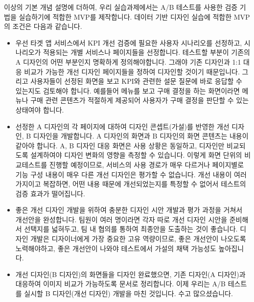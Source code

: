 \documentclass[
  letterpaper,
]{book}
\providecommand{\tightlist}{%
  \setlength{\itemsep}{0pt}\setlength{\parskip}{0pt}}\usepackage{longtable,booktabs,array}
\begin{document}
이상의 기본 개념 설명에 더하여, 우리 실습과제에서는 A/B 테스트를 사용한
검증 기법을 실습하기에 적합한 MVP를 제작합니다. 데이터 기반 디자인
실습에 적합한 MVP의 조건은 다음과 같습니다.

\begin{itemize}
\tightlist
\item
  우선 타겟 앱 서비스에서 KPI 개선 검증에 필요한 사용자 시나리오를
  선정하고, 시나리오가 적용되는 개별 서비스나 페이지들을 선정합니다.
  테스트할 부분이 기존의 A 디자인의 어떤 부분인지 명확하게
  정의해야합니다. 그래야 기존 디자인과 1:1 대응 비교가 가능한 개선
  디자인 페이지들을 정하여 디자인할 것이기 때문입니다. 그리고 사용자들이
  선정된 화면을 보고 KPI와 관련한 설문 질문에 바로 응답할 수 있는지도
  검토해야 합니다. 예를들어 메뉴를 보고 구매 결정을 하는 화면이라면
  메뉴나 구매 관련 콘텐츠가 적절하게 제공되어 사용자가 구매 결정을
  판단할 수 있는 상태여야 합니다.
\item
  선정한 A 디자인의 각 페이지에 대하여 디자인 콘셉트(가설)를 반영한 개선
  디자인, B 디자인을 개발합니다. A 디자인의 화면과 B 디자인의 화면
  콘텐츠는 내용이 같아야 합니다. A, B 디자인 대응 화면은 사용 상황은
  동일하고, 디자인만 비교되도록 설계하여야 디자인 변화의 영향을 측정할
  수 있습니다. 이렇게 화면 단위의 비교테스트를 진행할 예정이므로,
  서비스의 사용 경로가 매우 다르거나 페이지별로 기능 구성 내용이 매우
  다른 개선 디자인은 평가할 수 없습니다. 개선 내용이 여러가지이고
  복잡하면, 어떤 내용 때문에 개선되었는지를 특정할 수 없어서 테스트의
  검증 효과가 떨어집니다.
\item
  좋은 개선 디자인 개발을 위하여 충분한 디자인 시안 개발과 평가 과정을
  거쳐서 개선안을 완성합니다. 팀원이 여러 명이라면 각자 따로 개선 디자인
  시안을 준비해서 선택지를 넓혀두고, 팀 내 협의를 통하여 최종안을
  도출하는 것이 좋습니다. 디자인 개발은 디자이너에게 가장 중요한 고유
  역량이므로, 좋은 개선안이 나오도록 노력해야하고, 좋은 개선안이 나와야
  테스트에서 가설의 채택 가능성도 높아집니다.
\item
  개선 디자인(B 디자인)의 화면들을 디자인 완료했으면, 기존 디자인(A
  디자인)과 대응하여 이미지 비교가 가능하도록 문서로 정리합니다. 이제
  우리는 A/B 테스트를 실시할 B 디자인(개선 디자인) 개발을 마친 것입니다.
  수고 많으셨습니다.
\end{itemize}
\end{document}

